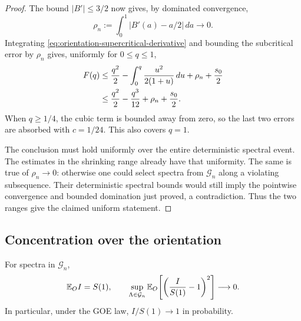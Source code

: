 \begin{proof}
The bound $|B'|\le3/2$ now gives, by dominated convergence,
\[
 \rho_n:=\int_0^1|B'(a)-a/2|\,da\longrightarrow0.
\]
Integrating \eqref{eq:orientation-supercritical-derivative} and bounding the
subcritical error by $\rho_n$ gives, uniformly for $0\le q\le1$,
\begin{align}
 F(q)
 &\le \frac{q^2}{2}
       -\int_0^q\frac{u^2}{2(1+u)}\,du+\rho_n+\frac{s_0}{2} \notag\\
 &\le \frac{q^2}{2}-\frac{q^3}{12}+\rho_n+\frac{s_0}{2}.
 \label{eq:orientation-macroscopic-deficit}
\end{align}
When $q\ge1/4$, the cubic term is bounded away from zero, so the last two
errors are absorbed with $c=1/24$.  This also covers $q=1$.

The conclusion must hold uniformly over the entire deterministic
spectral event. The estimates in the shrinking range already have
that uniformity.
The same is true of $\rho_n\to0$: otherwise one could select spectra from
$\mathcal G_n$ along a violating subsequence.  Their deterministic spectral
bounds would still imply the pointwise convergence and bounded domination
just proved, a contradiction.  Thus the two ranges give the claimed
uniform statement.
\end{proof}

\subsection{Concentration over the orientation}

\begin{proposition}
\label{prop:orientation-concentration}
For spectra in $\mathcal G_n$,
\[
 \mathbb E_O I=S(1),
 \qquad
 \sup_{\Lambda\in\mathcal G_n}
 \mathbb E_O\!\left[\left(\frac{I}{S(1)}-1\right)^2\right]\longrightarrow0.
\]
In particular, under the GOE law, $I/S(1)\to1$ in probability.
\end{proposition}

